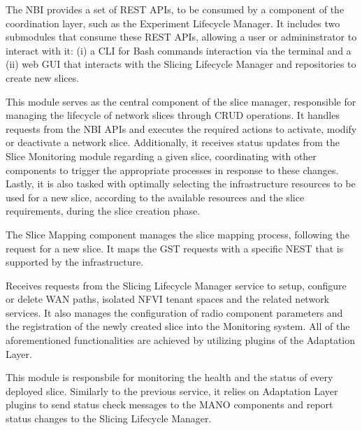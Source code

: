 
The \acf{NBI} provides a set of \acs{REST} \acsp{API}, to be consumed by a component of the coordination layer, such as the Experiment Lifecycle Manager. It includes two submodules that consume these \acs{REST} \acsp{API}, allowing a user or admininstrator to interact with it: (i) a \acf{CLI} for Bash commands interaction via the terminal and a (ii) web \acf{GUI} that interacts with the Slicing Lifecycle Manager and repositories to create new slices. 


This module serves as the central component of the slice manager, responsible for managing the lifecycle of network slices through \acs{CRUD} operations. It handles requests from the \acs{NBI} \acsp{API} and executes the required actions to activate, modify or deactivate a network slice. Additionally, it receives status updates from the Slice Monitoring module regarding a given slice, coordinating with other components to trigger the appropriate processes in response to these changes. Lastly, it is also tasked with optimally selecting the infrastructure resources to be used for a new slice, according to the available resources and the slice requirements, during the slice creation phase.


The Slice Mapping component manages the slice mapping process, following the request for a new slice. It maps the \acs{GST} requests with a specific \acs{NEST} that is supported by the infrastructure.


Receives requests from the Slicing Lifecycle Manager service to setup, configure or delete \acs{WAN} paths, isolated \acs{NFVI} tenant spaces and the related network services. It also manages the configuration of radio component parameters and the registration of the newly created slice into the Monitoring system. All of the aforementioned functionalities are achieved by utilizing plugins of the Adaptation Layer.


This module is responsbile for monitoring the health and the status of every deployed slice. Similarly to the previous service, it relies on Adaptation Layer plugins to send status check messages to the \acs{MANO} components and report status changes to the Slicing Lifecycle Manager.

